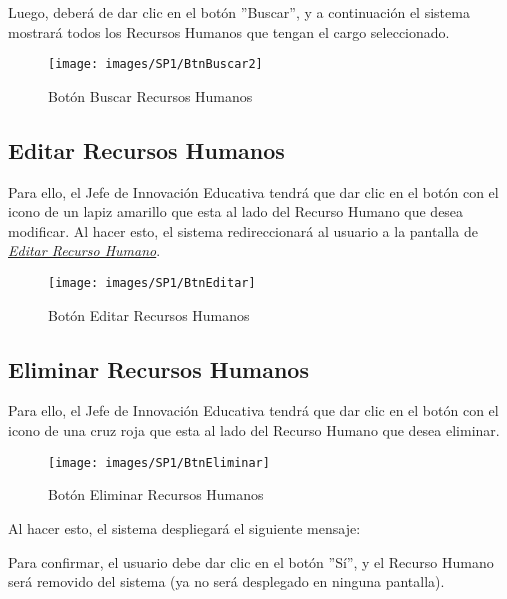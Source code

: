         	Luego, deberá de dar clic en el botón ''Buscar'', y a continuación el sistema mostrará todos los Recursos Humanos que tengan el cargo seleccionado.
        	\begin{figure}[!hbtp]
        		\centering
        		\hypertarget{buscar}{\texttt{[image: images/SP1/BtnBuscar2]}}
        		\caption{Botón Buscar Recursos Humanos}
        		\label{buscar}
        	\end{figure}

	    \subsection{Editar Recursos Humanos}

        	Para ello, el Jefe de Innovación Educativa tendrá que dar clic en el botón con el icono de un lapiz amarillo que esta al lado del Recurso Humano que desea modificar. Al hacer esto, el sistema redireccionará al usuario a la pantalla de \hyperlink{editarrh}{\textit{Editar Recurso Humano}}.
        
        	\begin{figure}[!hbtp]
        		\centering
        		\hypertarget{editar}{\texttt{[image: images/SP1/BtnEditar]}}
        		\caption{Botón Editar Recursos Humanos}
        		\label{editar}
        	\end{figure}
    \newpage
	    
	    \subsection{Eliminar Recursos Humanos}

        	Para ello, el Jefe de Innovación Educativa tendrá que dar clic en el botón con el icono de una cruz roja que esta al lado del Recurso Humano que desea eliminar. 

        	\begin{figure}[!hbtp]
        		\centering
        		\hypertarget{eliminar}{\texttt{[image: images/SP1/BtnEliminar]}}
        		\caption{Botón Eliminar Recursos Humanos}
        		\label{eliminar}
        	\end{figure}
        
        	Al hacer esto, el sistema despliegará el siguiente mensaje:
        
        	Para confirmar, el usuario debe dar clic en el botón ''Sí'', y el Recurso Humano será removido del sistema (ya no será desplegado en ninguna pantalla).\\
        
